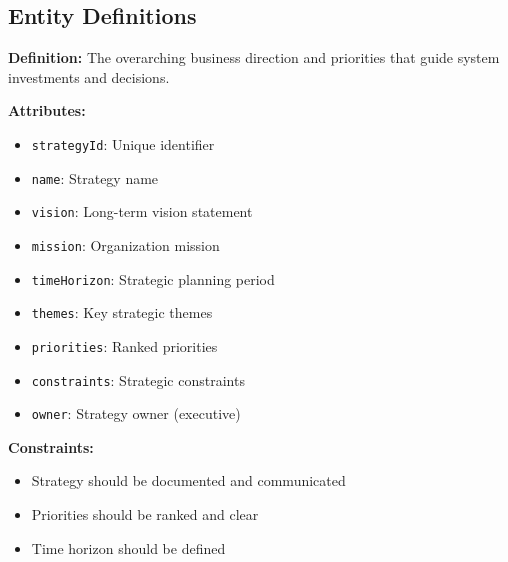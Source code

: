 \documentclass[11pt,letterpaper]{article}
\begin{document}
\subsection{Entity Definitions}

\begin{definitionbox}
\textbf{Definition:} The overarching business direction and priorities that guide system investments and decisions.

\textbf{Attributes:}
\begin{itemize}[nosep]
    \item \texttt{strategyId}: Unique identifier
    \item \texttt{name}: Strategy name
    \item \texttt{vision}: Long-term vision statement
    \item \texttt{mission}: Organization mission
    \item \texttt{timeHorizon}: Strategic planning period
    \item \texttt{themes}: Key strategic themes
    \item \texttt{priorities}: Ranked priorities
    \item \texttt{constraints}: Strategic constraints
    \item \texttt{owner}: Strategy owner (executive)
\end{itemize}

\textbf{Constraints:}
\begin{itemize}[nosep]
    \item Strategy should be documented and communicated
    \item Priorities should be ranked and clear
    \item Time horizon should be defined
\end{itemize}
\end{definitionbox}
\end{document}
